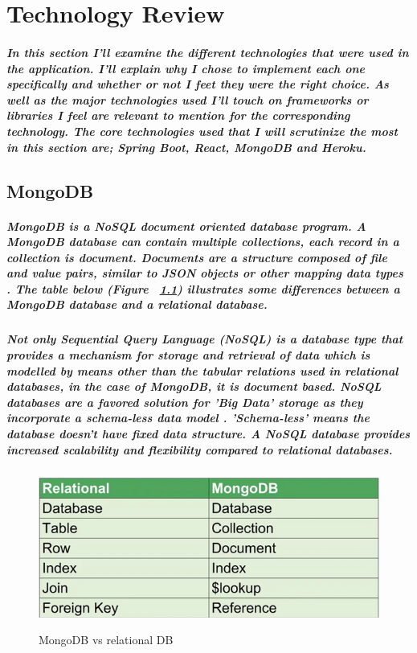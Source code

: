 \chapter{Technology Review}
\paragraph{In this section I'll examine the different technologies that were used in the application. I'll explain why I chose to implement each one specifically and whether or not I feet they were the right choice. As well as the major technologies used I'll touch on frameworks or libraries I feel are relevant to mention for the corresponding technology. The core technologies used that I will scrutinize the most in this section are; Spring Boot, React, MongoDB and Heroku.}

\section{MongoDB}
\paragraph{MongoDB is a NoSQL document oriented database program. A MongoDB database can contain multiple collections, each record in a collection is document. Documents are a structure composed of file and value pairs, similar to JSON objects or other mapping data types \cite{Mongo:doc}. The table below (Figure ~\ref{mongo2_label}) illustrates some differences between a MongoDB database and a relational database.}
\paragraph{Not only Sequential Query Language (NoSQL) is a database type that provides a mechanism for storage and retrieval of data which is modelled by means other than the tabular relations used in relational databases, in the case of MongoDB, it is document based. NoSQL databases are a favored solution for 'Big Data' storage as they incorporate a schema-less data model \cite{wiki:nosql}. 'Schema-less' means the database doesn't have fixed data structure. A NoSQL database provides increased scalability and ﬂexibility compared to relational databases.}
\begin{figure}[h]
    \centering
    \includegraphics[scale=0.4]{Images/mongo2.png} 
    \label{mongo2_label}
    \caption{MongoDB vs relational DB}
\end{figure}

